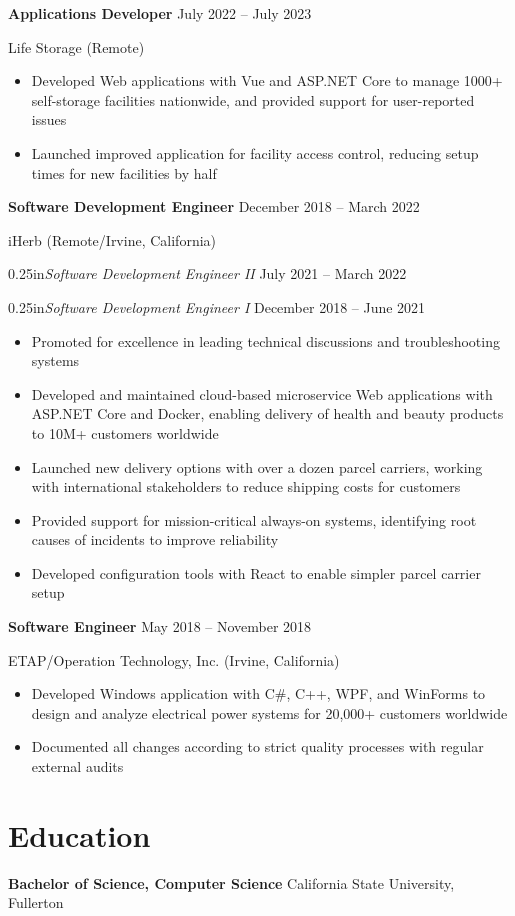 \documentclass[12pt]{article}
\newcommand{\titleheader}[2]{\textbf{#1} \symbol{"B7} #2}
\newcommand{\secondaryheader}[2]{\begin{adjustwidth}{0.25in}{}\textit{#1} \symbol{"B7} #2\end{adjustwidth}}
\newcommand{\locheader}[2]{#1 (#2)}
\begin{document}
	\titleheader{Applications Developer}{July 2022 -- July 2023}

	\locheader{Life Storage}{Remote}

	\begin{itemize}
		\item Developed Web applications with Vue and ASP.NET Core to manage 1000+ self-storage facilities nationwide, and provided support for user-reported issues
		\item Launched improved application for facility access control, reducing setup times for new facilities by half
	\end{itemize}

	\titleheader{Software Development Engineer}{December 2018 -- March 2022}

	\locheader{iHerb}{Remote/Irvine, California}

	\secondaryheader{Software Development Engineer II}{July 2021 -- March 2022}

	\secondaryheader{Software Development Engineer I}{December 2018 -- June 2021}

	\begin{itemize}
		\item Promoted for excellence in leading technical discussions and troubleshooting systems
		\item Developed and maintained cloud-based microservice Web applications with ASP.NET Core and Docker, enabling delivery of health and beauty products to 10M+ customers worldwide
		\item Launched new delivery options with over a dozen parcel carriers, working with international stakeholders to reduce shipping costs for customers
		\item Provided support for mission-critical always-on systems, identifying root causes of incidents to improve reliability
		\item Developed configuration tools with React to enable simpler parcel carrier setup
	\end{itemize}

	\titleheader{Software Engineer}{May 2018 -- November 2018}

	\locheader{ETAP/Operation Technology, Inc.}{Irvine, California}

	\begin{itemize}
		\item Developed Windows application with C\#, C++, WPF, and WinForms to design and analyze electrical power systems for 20,000+ customers worldwide
		\item Documented all changes according to strict quality processes with regular external audits
	\end{itemize}

	\section*{Education}

	\textbf{Bachelor of Science, Computer Science}  California State University, Fullerton
\end{document}

